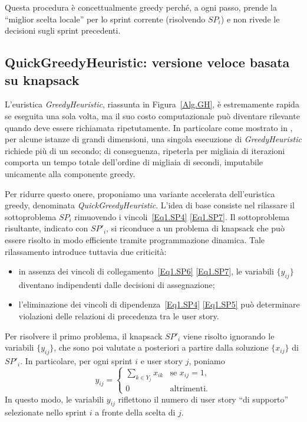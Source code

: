 \documentclass[12pt,a4paper,openright,twoside]{book}
\begin{document}
Questa procedura è concettualmente greedy perché, a ogni passo, prende la “miglior scelta locale” per lo sprint corrente (risolvendo $SP_i$) e non rivede le decisioni sugli sprint precedenti. 


\subsection{QuickGreedyHeuristic: versione veloce basata su knapsack}
\label{Sec.QuickGreedy}

L'euristica \textit{GreedyHeuristic}, riassunta in Figura~\ref{Alg.GH}, è estremamente rapida se eseguita una sola volta, ma il suo costo computazionale può diventare rilevante quando deve essere richiamata ripetutamente. In particolare come mostrato in \cite{BOSCHETTI2014116}, per alcune istanze di grandi dimensioni, una singola esecuzione di \textit{GreedyHeuristic} richiede più di un secondo; di conseguenza, ripeterla per migliaia di iterazioni comporta un tempo totale dell'ordine di migliaia di secondi, imputabile unicamente alla componente greedy.

Per ridurre questo onere, proponiamo una variante accelerata dell'euristica greedy, denominata \textit{QuickGreedyHeuristic}. L'idea di base consiste nel rilassare il sottoproblema $SP_i$ rimuovendo i vincoli~\eqref{Eq1.SP4} \eqref{Eq1.SP7}. Il sottoproblema risultante, indicato con $SP'_i$, si riconduce a un problema di knapsack che può essere risolto in modo efficiente tramite programmazione dinamica. Tale rilassamento introduce tuttavia due criticità:

\begin{itemize}
    \item in assenza dei vincoli di collegamento~\eqref{Eq1.SP6} \eqref{Eq1.SP7}, le variabili $\{y_{ij}\}$ diventano indipendenti dalle decisioni di assegnazione;
    \item l'eliminazione dei vincoli di dipendenza~\eqref{Eq1.SP4} \eqref{Eq1.SP5} può determinare violazioni delle relazioni di precedenza tra le user story.
\end{itemize}

Per risolvere il primo problema, il knapsack $SP'_i$ viene risolto ignorando le variabili $\{y_{ij}\}$, che sono poi valutate a posteriori a partire dalla soluzione $\{x_{ij}\}$ di $SP'_i$. In particolare, per ogni sprint $i$ e user story $j$, poniamo
\[
y_{ij} =
\begin{cases}
\displaystyle \sum_{k \in Y_j} x_{ik} & \text{se } x_{ij} = 1,\\[4pt]
0 & \text{altrimenti.}
\end{cases}
\]
In questo modo, le variabili $y_{ij}$ riflettono il numero di user story ``di supporto'' selezionate nello sprint $i$ a fronte della scelta di $j$.
\end{document}

